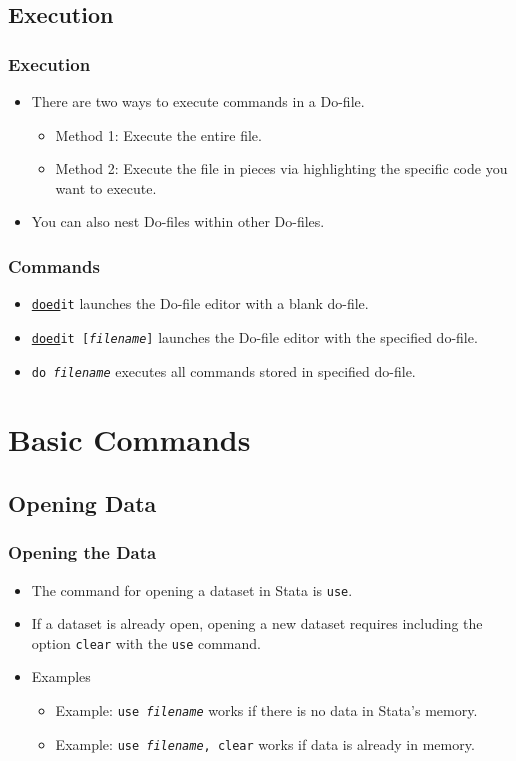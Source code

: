 \documentclass{beamer}
\begin{document}
\subsection{Execution}

\begin{frame}
	\frametitle{Execution}
		\begin{itemize}
		\item There are two ways to execute commands in a Do-file.
			\begin{itemize}
				\item Method 1: Execute the entire file.
				\item Method 2: Execute the file in pieces via highlighting the specific code you want to execute.
			\end{itemize}
		\item You can also nest Do-files within other Do-files.
		\end{itemize}
\end{frame}

\begin{frame}
	\frametitle{Commands}
	\begin{itemize}
		\item \texttt{\underline{doed}it} launches the Do-file editor with a blank do-file.
		\item \texttt{\underline{doed}it [\textit{filename}]} launches the Do-file editor with the specified do-file.
		\item \texttt{do \textit{filename}} executes all commands stored in specified do-file. 
	\end{itemize}
\end{frame}

\section{Basic Commands}
\subsection{Opening Data}

\begin{frame}
	\frametitle{Opening the Data}
		\begin{itemize}
			\item The command for opening a dataset in Stata is \texttt{use}.
			\item If a dataset is already open, opening a new dataset requires including the option \texttt{clear} with the \texttt{use} command.
			\item Examples
				\begin{itemize}
					\item Example: \texttt{use \textit{filename}} works if there is no data in Stata's memory.
					\item Example: \texttt{use \textit{filename}, clear} works if data is already in memory.
				\end{itemize}
		\end{itemize}
\end{frame}
\end{document}
